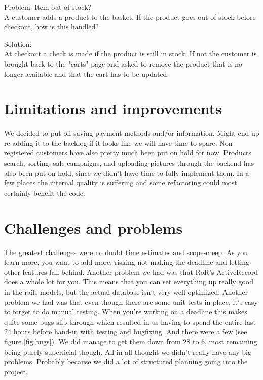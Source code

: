 \documentclass[paper=a4, fontsize=11pt]{report} %
\begin{document}
\begin{itemize}
	Problem: Item out of stock? \\
		A customer adds a product to the basket. If the product goes out of
		stock before checkout, how is this handled?

	Solution: \\
		At checkout a check is made if the product is still in stock. If not
		the customer is brought back to the "carts" page and asked to remove
		the product that is no longer available and that the cart has to be
		updated.

\section*{Limitations and improvements}

	We decided to put off saving payment methods and/or information. Might
	end up re-adding it to the backlog if it looks like we will have time
	to spare. Non-registered customers have also pretty much been put on hold for now.
	Products search, sorting, sale campaigns, and uploading pictures
	through the backend has also been put on hold, since we didn't have
	time to fully implement them. In a few places the internal quality is suffering and
	some refactoring could most certainly benefit the code.

\section*{Challenges and problems}

	The greatest challenges were no doubt time estimates and scope-creep. As you learn more, you want to add more, risking not making the deadline and letting other features fall behind. Another problem we had was that RoR's ActiveRecord does a whole lot for you. This means that you can set everything up really good in the rails models, but the actual database isn't very well optimized.
	Another problem we had was that even though there are some unit tests in place, it's easy to forget to do manual testing. When you're working on a deadline this makes quite some bugs slip through which resulted in us having to spend the entire last 24 hours before hand-in with testing and bugfixing. And there were a few (see figure \ref{fig:bugs}). We did manage to get them down from 28 to 6, most remaining being purely superficial though.
	All in all thought we didn't really have any big problems. Probably because  we did a lot of structured planning going into the project.


\end{itemize}
\end{document}
